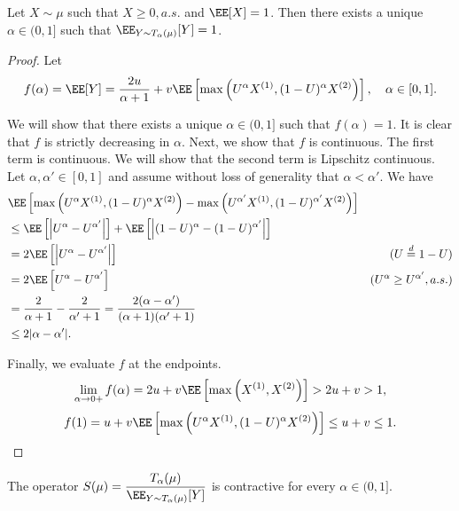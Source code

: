 \begin{proposition}
  Let $X\sim\mu$ such that $X\ge 0, a.s.$ and $\EE[X]=1$. Then there exists a unique $\alpha\in(0,1]$ such that $\EE_{Y\sim T_\alpha(\mu)}[Y] = 1$.
\end{proposition}
\begin{proof}
  Let
  $$f(\alpha) = \EE[Y] = \dfrac{2u}{\alpha+1} + v\EE\left[\max\left(U^\alpha X^{(1)}, (1-U)^\alpha X^{(2)}\right)\right], \quad\alpha\in [0,1].$$

  We will show that there exists a unique $\alpha\in(0,1]$ such that $f(\alpha)=1$. It is clear that $f$ is strictly decreasing in $\alpha$. Next, we show that $f$ is continuous. The first term is continuous. We will show that the second term is Lipschitz continuous. Let $\alpha, \alpha' \in [0,1]$ and assume without loss of generality that $\alpha < \alpha'$. We have
  \begin{align*}
     & \EE\left[\max\left(U^\alpha X^{(1)}, (1-U)^\alpha X^{(2)}\right) - \max\left(U^{\alpha'} X^{(1)}, (1-U)^{\alpha'} X^{(2)}\right)\right] \\
     & \le \EE\left[\left|U^\alpha - U^{\alpha'}\right|\right] + \EE\left[\left|(1-U)^\alpha - (1-U)^{\alpha'}\right|\right]                   \\
     & = 2\EE\left[\left|U^\alpha - U^{\alpha'}\right|\right]
     & \text{($U \stackrel{d}{=} 1-U$)}                                                                                                        \\
     & = 2\EE\left[U^\alpha - U^{\alpha'}\right]
     & \text{($U^\alpha\ge U^{\alpha'}, a.s.$)}                                                                                                \\
     & = \dfrac{2}{\alpha+1} - \dfrac{2}{\alpha'+1} = \dfrac{2(\alpha-\alpha')}{(\alpha+1)(\alpha'+1)}                                         \\
     & \le 2|\alpha-\alpha'|.
  \end{align*}

  Finally, we evaluate $f$ at the endpoints.
  $$\lim_{\alpha \to 0+} f(\alpha) = 2u+v\EE\left[\max\left(X^{(1)}, X^{(2)}\right)\right] > 2u+v > 1,$$
  $$f(1) = u + v\EE\left[\max\left(U^\alpha X^{(1)}, (1-U)^\alpha X^{(2)}\right)\right] \le u+v \le 1.$$
\end{proof}

\begin{conjecture}
  The operator $S(\mu) = \dfrac{T_\alpha(\mu)}{\EE_{Y\sim T_\alpha(\mu)}[Y]}$ is contractive for every $\alpha\in(0,1]$.
\end{conjecture}

